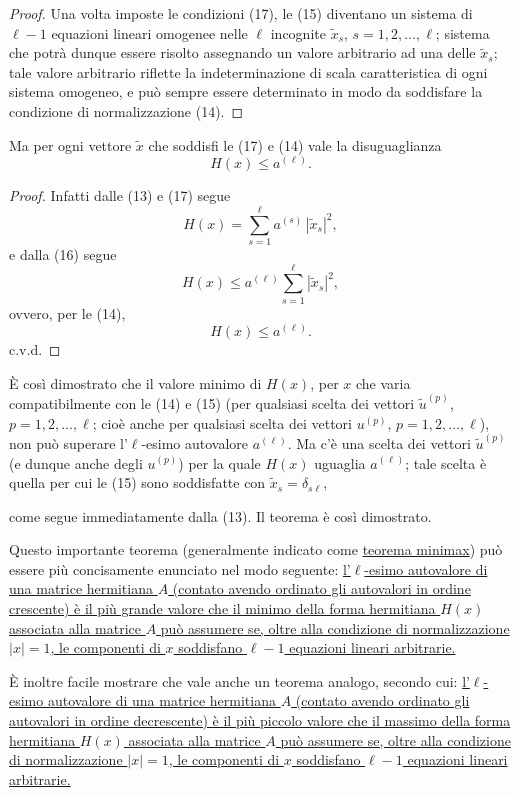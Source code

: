 \documentclass[11pt, a4paper]{book}
\numberwithin{equation}{section}
\begin{document}
\begin{proof}
Una volta imposte le condizioni (17), le (15) diventano un sistema di
$\ell-1$ equazioni lineari omogenee nelle $\ell$ incognite $\widetilde{x}_s$,
$s = 1, 2, \ldots, \ell$; sistema che potrà dunque essere risolto assegnando
un valore arbitrario ad una delle $\widetilde{x}_s$; tale valore arbitrario
riflette la indeterminazione di scala caratteristica di ogni sistema
omogeneo, e può sempre essere determinato in modo da soddisfare la
condizione di normalizzazione (14).
\end{proof}

Ma per ogni vettore $\widetilde{x}$ che soddisfi le (17) e (14) vale la
disuguaglianza
\begin{equation}
H(x) \leq a^{(\ell)}.
\end{equation}

\begin{proof}
Infatti dalle (13) e (17) segue
\[
H(x) = \sum_{s=1}^{\ell} a^{(s)}\,|\widetilde{x}_s|^2,
\]
e dalla (16) segue
\[
H(x) \leq a^{(\ell)} \sum_{s=1}^{\ell} |\widetilde{x}_s|^2,
\]
ovvero, per le (14),
\[
H(x) \leq a^{(\ell)}.
\]
c.v.d.
\end{proof}

È così dimostrato che il valore minimo di $H(x)$, per $x$ che varia
compatibilmente con le (14) e (15) (per qualsiasi scelta dei vettori
$\widetilde{u}^{(p)}$, $p = 1, 2, \ldots, \ell$; cioè anche per qualsiasi
scelta dei vettori $u^{(p)}$, $p=1,2,\ldots,\ell$), non può superare
l'$\ell$-esimo autovalore $a^{(\ell)}$. Ma c'è una scelta dei vettori
$\widetilde{u}^{(p)}$ (e dunque anche degli $u^{(p)}$) per la quale $H(x)$
uguaglia $a^{(\ell)}$; tale scelta è quella per cui le (15) sono soddisfatte
con $\widetilde{x}_s = \delta_{s\ell}$,


come segue immediatamente dalla (13). Il teorema è così dimostrato.

Questo importante teorema (generalmente indicato come \uline{teorema
minimax}) può essere più concisamente enunciato nel modo seguente:
\uline{l'$\ell$-esimo autovalore di una matrice hermitiana $A$ (contato
avendo ordinato gli autovalori in ordine crescente) è il più grande valore
che il minimo della forma hermitiana $H(x)$ associata alla matrice $A$ può
assumere se, oltre alla condizione di normalizzazione $|x| = 1$, le
componenti di $x$ soddisfano $\ell-1$ equazioni lineari arbitrarie.}

È inoltre facile mostrare che vale anche un teorema analogo, secondo cui:
\uline{l'$\ell$-esimo autovalore di una matrice hermitiana $A$ (contato
avendo ordinato gli autovalori in ordine decrescente) è il più piccolo
valore che il massimo della forma hermitiana $H(x)$ associata alla matrice
$A$ può assumere se, oltre alla condizione di normalizzazione $|x| = 1$,
le componenti di $x$ soddisfano $\ell-1$ equazioni lineari arbitrarie.}
\end{document}
